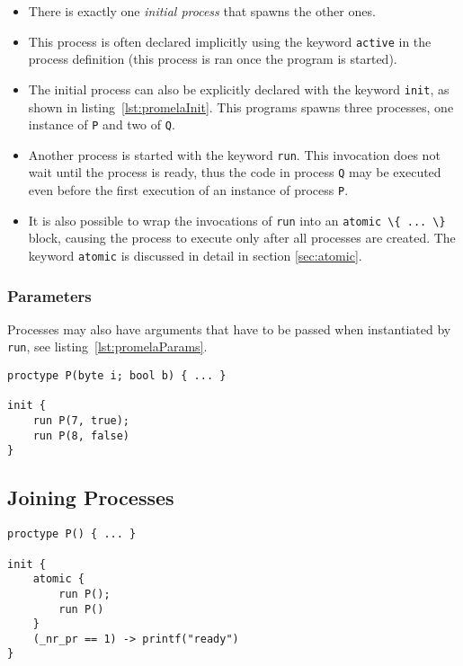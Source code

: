 \documentclass[a4paper, 11pt, accentcolor = tud3b]{tudreport}
\newcommand{\inlinePromela}[1]{\lstinline[language = PROMELA]|#1|}
\begin{document}
				\begin{itemize}
					\item There is exactly one \textit{initial process} that spawns the other ones.
					\item This process is often declared implicitly using the keyword \inlinePromela{active} in the process definition (this process is ran once the program is started).
					\item The initial process can also be explicitly declared with the keyword \inlinePromela{init}, as shown in listing~\ref{lst:promelaInit}. This programs spawns three processes, one instance of \inlinePromela{P} and two of \inlinePromela{Q}.
					\item Another process is started with the keyword \inlinePromela{run}. This invocation does not wait until the process is ready, thus the code in process \inlinePromela{Q} may be executed even before the first execution of an instance of process \inlinePromela{P}.
					\item It is also possible to wrap the invocations of \inlinePromela{run} into an \inlinePromela{atomic \{ ... \}} block, causing the process to execute only after all processes are created. The keyword \inlinePromela{atomic} is discussed in detail in section \ref{sec:atomic}.
				\end{itemize}
			
				\subsubsection{Parameters}
					Processes may also have arguments that have to be passed when instantiated by \inlinePromela{run}, see listing~\ref{lst:promelaParams}.
					
					\begin{lstlisting}[caption = { PROMELA Processes with Parameters }, label = lst:promelaParams, language = PROMELA]
proctype P(byte i; bool b) { ... }

init {
	run P(7, true);
	run P(8, false)
}
					\end{lstlisting}

			\subsection{Joining Processes}
				\begin{lstlisting}[caption = { Joining PROMELA Processes }, label = lst:promelaJoin, language = PROMELA]
proctype P() { ... }

init {
	atomic {
		run P();
		run P()
	}
	(_nr_pr == 1) -> printf("ready")
}
				\end{lstlisting}
			
\end{document}
